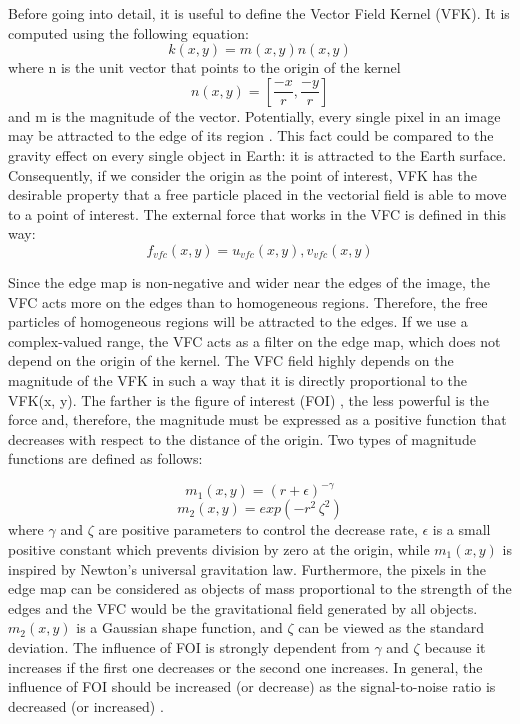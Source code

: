 \documentclass[final,a4paper,12pt,english]{UnicaPhdThesis3}
\begin{document}
Before going into detail, it is useful to define the Vector Field Kernel (VFK). It is computed using the following equation:
\begin{equation}
k ( x,y ) =m(x,y)n(x,y)
\end{equation}
where n is the unit vector that points to the origin of the kernel	
\begin{equation}
n ( x,y ) = [\frac{-x}{r} , \frac{-y}{r} ]
\end{equation}
and m is the magnitude of the vector. Potentially, every single pixel in an image may be attracted to the edge of its region \cite{VFC}. This fact could be compared to the gravity effect on every single object in Earth: it is attracted to the Earth surface. Consequently, if we consider the origin as the point of interest, VFK has the desirable property that a free particle placed in the vectorial field is able to move to a point of interest. The external force that works in the VFC is defined in this way:
\begin{equation}
{f} _{vfc} ( x,y ) = {u} _{vfc} ( x,y ) , {v} _{vfc} (x,y)
\end{equation}

Since the edge map is non-negative and wider near the edges of the image, the VFC acts more on the edges than to homogeneous regions. Therefore, the free particles of homogeneous regions will be attracted to the edges. If we use a complex-valued range, the VFC acts as a filter on the edge map, which does not depend on the origin of the kernel. The VFC field highly depends on the magnitude of the VFK in such a way that it is directly proportional to the VFK(x, y). 
The farther is the figure of interest (FOI) \cite{VFC}, the less powerful is the force and, therefore, the magnitude must be expressed as a positive function that decreases with respect to the distance of the origin. Two types of magnitude functions are defined as follows:

\begin{equation}
{m} _{1} ( x,y ) =(r+\epsilon) ^{-\gamma}
\end{equation}
\begin{equation}
{m} _{2} ( x,y ) =exp(-r^{2}\, \zeta ^{2})
\end{equation}
where $\gamma$ and $\zeta$ are positive parameters to control the decrease rate, $\epsilon$ is a small positive constant which prevents division by zero at the origin, while ${m} _{1} ( x,y )$ is inspired by Newton's universal gravitation law. Furthermore, the pixels in the edge map can be considered as objects of mass proportional to the strength of the edges and the VFC would be the gravitational field generated by all objects. 
${m} _{2} ( x,y )$ is a Gaussian shape function, and $\zeta$ can be viewed as the standard deviation.
The influence of FOI is strongly dependent from $\gamma$ and $\zeta$ because it increases if the first one decreases or the second one increases. 
In general, the influence of FOI should be increased (or decrease) as the signal-to-noise ratio is decreased (or increased) \cite{VFC}.
\end{document}
